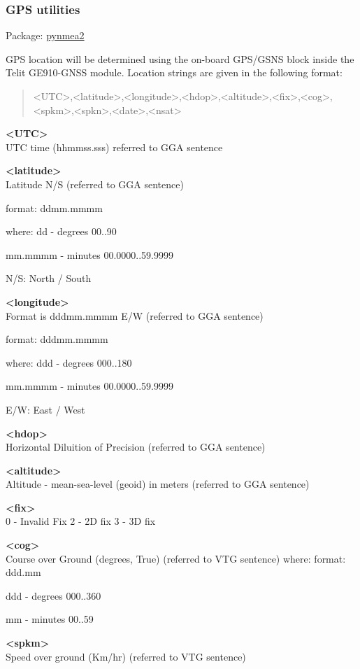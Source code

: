 \subsubsection{GPS utilities}

Package:	\href{https://github.com/Knio/pynmea2}{pynmea2}

GPS location will be determined using the on-board GPS/GSNS block inside the Telit GE910-GNSS module. Location strings are given in the following format:
\begin{quote}
<UTC>,<latitude>,<longitude>,<hdop>,<altitude>,<fix>,<cog>,<spkm>,<spkn>,<date>,<nsat>
\end{quote} 

\textbf{<UTC>} \\
UTC time (hhmmss.sss) referred to GGA sentence

\textbf{<latitude>} \\
Latitude N/S (referred to GGA sentence)
	
format:
ddmm.mmmm
					
where:
dd - degrees
00..90

mm.mmmm - minutes
00.0000..59.9999

N/S: North / South 

\textbf{<longitude>} \\
Format is dddmm.mmmm E/W (referred to GGA sentence) 

format:
dddmm.mmmm

where:
ddd - degrees						
000..180

mm.mmmm - minutes				
00.0000..59.9999

E/W: East / West

\textbf{<hdop>} \\
Horizontal Diluition of Precision (referred to GGA sentence) 

\textbf{<altitude>} \\
Altitude - mean-sea-level (geoid) in meters (referred to GGA sentence)

\textbf{<fix>} \\
0 - Invalid Fix
2 - 2D fix
3 - 3D fix

\textbf{<cog>} \\
Course over Ground (degrees, True) (referred to VTG sentence) where:
format:
ddd.mm

ddd - degrees		 	 	 		
000..360

mm - minutes						
00..59

\textbf{<spkm>} \\
Speed over ground (Km/hr) (referred to VTG sentence)

